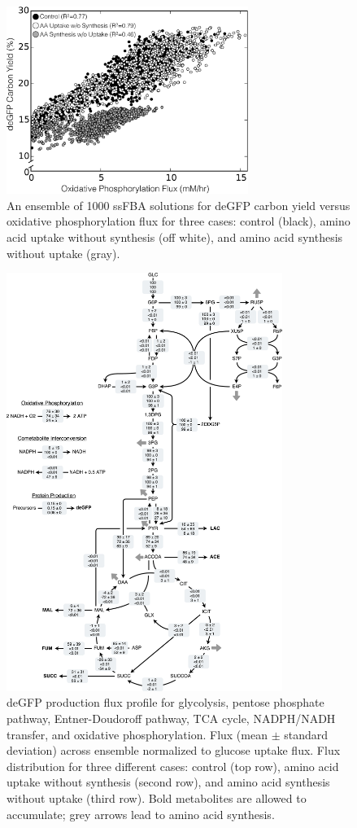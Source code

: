 \documentclass[journal=asbcd6,manuscript=article]{achemso}
\begin{document}
\begin{figure}[t!]
\includegraphics[width=0.7\textwidth]{./Figures/OxPhos_yield.pdf}
\caption{An ensemble of 1000 ssFBA solutions for deGFP carbon yield versus oxidative phosphorylation flux for three cases: control (black), amino acid uptake without synthesis (off white), and amino acid synthesis without uptake (gray). }
\label{fig:oxphos}
\end{figure}

\begin{figure}[t!]
\includegraphics[width=0.8\textwidth]{./Figures/flux.pdf}
\caption{deGFP production flux profile for glycolysis, pentose phosphate pathway, Entner-Doudoroff pathway, TCA cycle, NADPH/NADH transfer, and oxidative phosphorylation. Flux (mean $\pm$ standard deviation) across ensemble normalized to glucose uptake flux. Flux distribution for three different cases: control (top row), amino acid uptake without synthesis (second row), and amino acid synthesis without uptake (third row). Bold metabolites are allowed to accumulate; grey arrows lead to amino acid synthesis.}
\label{fig:flux}
\end{figure}
\end{document}
